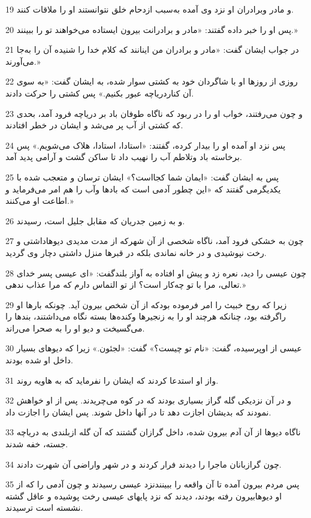 \par 19 و مادر وبرادران او نزد وی آمده به‌سبب ازدحام خلق نتوانستند او را ملاقات کنند.
\par 20 پس او را خبر داده گفتند: «مادر و برادرانت بیرون ایستاده می‌خواهند تو را ببینند.»
\par 21 در جواب ایشان گفت: «مادر و برادران من اینانند که کلام خدا را شنیده آن را به‌جا می‌آورند.»
\par 22 روزی از روزها او با شاگردان خود به کشتی سوار شده، به ایشان گفت: «به سوی آن کناردریاچه عبور بکنیم.» پس کشتی را حرکت دادند.
\par 23 و چون می‌رفتند، خواب او را در ربود که ناگاه طوفان باد بر دریاچه فرود آمد، بحدی که کشتی از آب پر می‌شد و ایشان در خطر افتادند.
\par 24 پس نزد او آمده او را بیدار کرده، گفتند: «استادا، استادا، هلاک می‌شویم.» پس برخاسته باد وتلاطم آب را نهیب داد تا ساکن گشت و آرامی پدید آمد.
\par 25 پس به ایشان گفت: «ایمان شما کجااست؟» ایشان ترسان و متعجب شده با یکدیگرمی گفتند که «این چطور آدمی است که بادها وآب را هم امر می‌فرماید و اطاعت او می‌کنند.»
\par 26 و به زمین جدریان که مقابل جلیل است، رسیدند.
\par 27 چون به خشکی فرود آمد، ناگاه شخصی از آن شهر‌که از مدت مدیدی دیوهاداشتی و رخت نپوشیدی و در خانه نماندی بلکه در قبرها منزل داشتی دچار وی گردید.
\par 28 چون عیسی را دید، نعره زد و پیش او افتاده به آواز بلندگفت: «ای عیسی پسر خدای تعالی، مرا با تو چه‌کار است؟ از تو التماس دارم که مرا عذاب ندهی.»
\par 29 زیرا که روح خبیث را امر فرموده بودکه از آن شخص بیرون آید. چونکه بارها او راگرفته بود، چنانکه هر‌چند او را به زنجیرها وکنده‌ها بسته نگاه می‌داشتند، بندها را می‌گسیخت و دیو او را به صحرا می‌راند.
\par 30 عیسی از اوپرسیده، گفت: «نام تو چیست؟» گفت: «لجئون.» زیرا که دیوهای بسیار داخل او شده بودند.
\par 31 واز او استدعا کردند که ایشان را نفرماید که به هاویه روند.
\par 32 و در آن نزدیکی گله گراز بسیاری بودند که در کوه می‌چریدند. پس از او خواهش نمودند که بدیشان اجازت دهد تا در آنها داخل شوند. پس ایشان را اجازت داد.
\par 33 ناگاه دیوها از آن آدم بیرون شده، داخل گرازان گشتند که آن گله ازبلندی به دریاچه جسته، خفه شدند.
\par 34 چون گرازبانان ماجرا را دیدند فرار کردند و در شهر واراضی آن شهرت دادند.
\par 35 پس مردم بیرون آمده تا آن واقعه را ببینندنزد عیسی رسیدند و چون آدمی را که از او دیوهابیرون رفته بودند، دیدند که نزد پایهای عیسی رخت پوشیده و عاقل گشته نشسته است ترسیدند.
